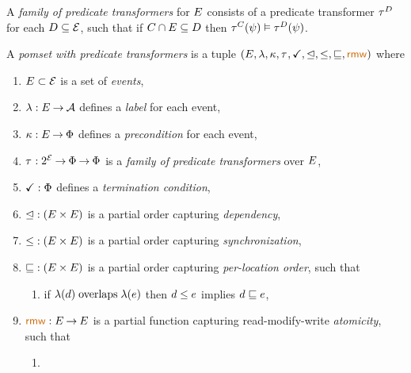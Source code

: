 \begin{definition}
  \label{def:family}
  A \emph{family of predicate transformers} for $E$ consists of a
  predicate transformer $\aTr{\bEvs}{}$ for each $D\subseteq\mathcal{E}$,
  such that if $C \cap E \subseteq D$ then
  $\aTr{\cEvs}{\bForm} \rimplies \aTr{\bEvs}{\bForm}$.
\end{definition}

\begin{definition}
  \label{def:pomset}
  A \emph{pomset with predicate transformers} 
  is a tuple $(\Event, \labeling, \labelingForm, \aTr{}{}, {\aTerm}, {\ledep}, {\lesync}, {\leloc}, {\rrmw})$ where
  \begin{enumerate}[,label=(\textsc{m}\arabic*),ref=\textsc{m}\arabic*]
  \item \label{pom-E}
    $E\subset\mathcal{E}$ is a set of \emph{events},
  \item \label{pom-lambda}
    $\lambda: E \mathbin\rightarrow \mathcal{A}$ defines a \emph{label} for each event,
  \item \label{pom-kappa}
    $\kappa:E\mathbin\rightarrow\Phi$ defines a \emph{precondition} for each event,
  \item \label{pom-tau}
    $\aTr{}{}:2^{\AllEvents}\fun\Formulae \fun\Formulae$ is a \emph{family of
      predicate transformers} over $E$, 
  \item \label{pom-term}
    $\aTerm:\Formulae$ defines a \emph{termination condition},
  \item
    \label{pom-ledep}
    ${\trianglelefteq} : (E\times E)$ is a partial order capturing \emph{dependency},
  \item
    \label{pom-lesync}
    ${\le} : (E\times E)$ is a partial order capturing
    \emph{synchronization}, 
  \item \label{pom-leloc}
    ${\sqsubseteq} : (E\times E)$ is a partial order capturing
    \emph{per-location order}, such that 
    \begin{enumerate}
    \item \label{pom-leloc-lesync}
      if $\lambda(d)\mathrel{\textnormal{{overlaps}}}\lambda(e)$ 
      then $d\le e$ implies $d\sqsubseteq e$,      
    \end{enumerate}
  \item \label{pom-rmw}
    ${\rrmw} : \Event\fun\Event$ is a partial function capturing
    read-modify-write \emph{atomicity}, such that
    \begin{enumerate}
    \item \label{pom-rmw-block}

\end{enumerate}
\end{enumerate}
\end{definition}
